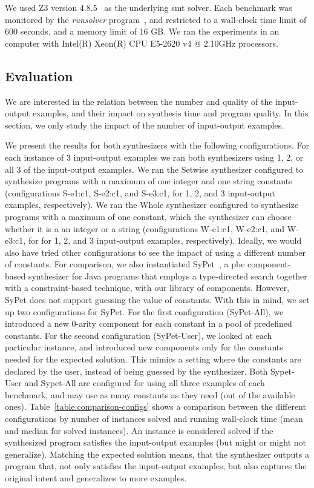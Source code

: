 We used Z3 version 4.8.5~\cite{DeMoura:2008:ZES} as the underlying \gls{smt}
solver. 
Each benchmark was monitored by the \textit{runsolver}
program~\cite{Roussel:2011:JSAT}, and restricted to a wall-clock time limit of
600 seconds, and a memory limit of 16 GB.
We ran the experiments in an computer with Intel(R) Xeon(R) CPU E5-2620 v4 @
2.10GHz processors.

\subsection{Evaluation}
\label{sec:eval}

We are interested in the relation between the number and quality of the
input-output examples, and their impact on synthesis time and program quality.
In this section, we only study the impact of the number of input-output
examples.

We present the results for both synthesizers with the following configurations.
For each instance of 3 input-output examples we ran both synthesizers using 1,
2, or all 3 of the input-output examples.
We ran the Setwise synthesizer configured
to synthesize programs with a maximum of one integer and one string constants
(configurations S-e1:c1, S-e2:c1, and S-e3:c1, for 1, 2, and 3 input-output
examples, respectively).
We ran the Whole synthesizer configured to
synthesize programs with a maximum of one constant, which the synthesizer can
choose whether it is a an integer or a string (configurations W-e1:c1, W-e2:c1,
and W-e3:c1, for for 1, 2, and 3 input-output examples, respectively).
Ideally, we would also have tried other configurations to see the impact of
using a different number of constants.
For comparison, we also instantiated SyPet~\cite{Feng:2017:CSC}, a
\gls{pbe} component-based synthesizer for Java programs that employs a
type-directed search together with a constraint-based technique, with our
library of components.
However, SyPet does not support guessing the value of constants.
With this in mind, we set up two configurations for SyPet.
For the first configuration (SyPet-All), we introduced a new 0-arity component
for each constant in a pool of predefined constants.
For the second configuration (SyPet-User), we looked at each particular
instance, and introduced new components only for the constants needed for the
expected solution.
This mimics a setting where the constants are declared by the user, instead of
being guessed by the synthesizer.
Both Sypet-User and Sypet-All are configured for using all three examples of
each benchmark, and may use as many constants as they need (out of the available
ones).
Table~\ref{table:comparison-configs} shows a comparison between the different
configurations by number of instances solved and running wall-clock time (mean
and median for solved instances).
An instance is considered solved if the synthesized program satisfies the
input-output examples (but might or might not generalize).
Matching the expected solution means, that the synthesizer outputs a program
that, not only satisfies the input-output examples, but also captures the
original intent and generalizes to more examples.

